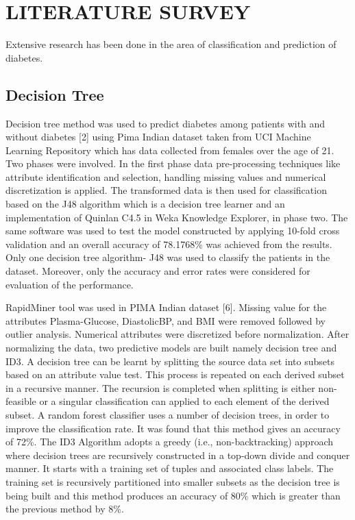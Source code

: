 
\chapter{LITERATURE SURVEY} 
Extensive research has been done in the area of classification and prediction of diabetes.
\section{Decision Tree}
Decision tree method was used to predict diabetes among patients with and without diabetes [2] using Pima Indian dataset taken from UCI Machine Learning Repository which has data collected from females over the age of 21. Two phases were involved. In the first phase data pre-processing techniques like attribute identification and selection, handling missing values and numerical discretization is applied. The transformed data is then used for classification based on the J48 algorithm which is a decision tree learner and an implementation of Quinlan C4.5 in Weka Knowledge Explorer, in phase two. The same software was used to test the model constructed by applying 10-fold cross validation and an overall accuracy of 78.1768\% was achieved from the results. Only one decision tree algorithm- J48 was used to classify the patients in the dataset. Moreover, only the accuracy and error rates were considered for evaluation of the performance.\par\noindent
RapidMiner tool was used in PIMA Indian dataset [6]. Missing value for the attributes Plasma-Glucose, DiastolicBP, and BMI were removed followed by outlier analysis. Numerical attributes were discretized before normalization. After normalizing the data, two predictive models are built namely decision tree and ID3.
A decision tree can be learnt by splitting the source data set into subsets based on an attribute value test. This process is repeated on each derived subset in a recursive manner. The recursion is completed when splitting is either non-feasible or a singular classification can applied to each element of the derived subset. A random forest classifier uses a number of decision trees, in order to improve the classification rate. It was found that this method gives an accuracy of 72\%.
The ID3 Algorithm adopts a greedy (i.e., non-backtracking) approach where decision trees are recursively constructed in a top-down divide and conquer manner. It starts with a training set of tuples and associated class labels. The training set is recursively partitioned into smaller subsets as the decision tree is being built and this method produces an accuracy of 80\% which is greater than the previous method by 8\%. \par\noindent  

